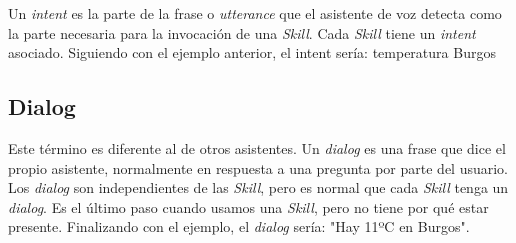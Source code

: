 Un \textit{intent} es la parte de la frase o \textit{utterance} que el asistente de voz detecta como la parte necesaria para la invocación de una \textit{Skill}. Cada \textit{Skill} tiene un \textit{intent} asociado. Siguiendo con el ejemplo anterior, el intent sería: temperatura Burgos

\subsection{Dialog}

Este término es diferente al de otros asistentes. Un \textit{dialog} es una frase que dice el propio asistente, normalmente en respuesta a una pregunta por parte del usuario. Los \textit{dialog} son independientes de las \textit{Skill}, pero es normal que cada \textit{Skill} tenga un \textit{dialog}. Es el último paso cuando usamos una \textit{Skill}, pero no tiene por qué estar presente. Finalizando con el ejemplo, el \textit{dialog} sería: "Hay 11ºC en Burgos".